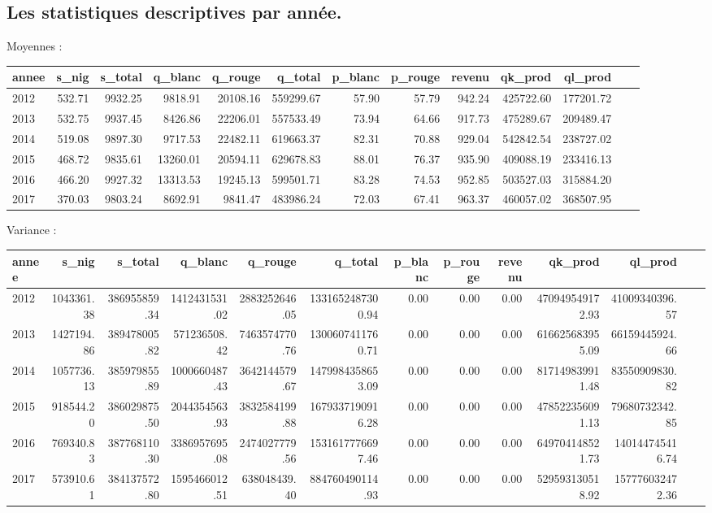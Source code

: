 \documentclass[11pt, a4paper]{article}
\begin{document}
\newpage
\begin{landscape}
\section*{Les statistiques descriptives par année.}
\par
Moyennes :
\FloatBarrier
\hskip-2.0cm
\begin{center}
\begin{tabular}{lrrrrrrrrrrrr}
  \hline
  annee & s\_nig & s\_total & q\_blanc & q\_rouge & q\_total & p\_blanc & p\_rouge & revenu & qk\_prod & ql\_prod \\ 
  \hline
  2012 & 532.71 & 9932.25 & 9818.91 & 20108.16 & 559299.67 & 57.90 & 57.79 & 942.24 & 425722.60 & 177201.72 \\ 
  2013 & 532.75 & 9937.45 & 8426.86 & 22206.01 & 557533.49 & 73.94 & 64.66 & 917.73 & 475289.67 & 209489.47 \\ 
  2014 & 519.08 & 9897.30 & 9717.53 & 22482.11 & 619663.37 & 82.31 & 70.88 & 929.04 & 542842.54 & 238727.02 \\ 
  2015 & 468.72 & 9835.61 & 13260.01 & 20594.11 & 629678.83 & 88.01 & 76.37 & 935.90 & 409088.19 & 233416.13 \\ 
  2016 & 466.20 & 9927.32 & 13313.53 & 19245.13 & 599501.71 & 83.28 & 74.53 & 952.85 & 503527.03 & 315884.20 \\ 
  2017 & 370.03 & 9803.24 & 8692.91 & 9841.47 & 483986.24 & 72.03 & 67.41 & 963.37 & 460057.02 & 368507.95 \\ 
   \hline
\end{tabular} 
\end{center}
\FloatBarrier
Variance :
\FloatBarrier
\hskip-1.0cm\begin{tabular}{lrrrrrrrrrrrr}
    \hline
   annee & s\_nig & s\_total & q\_blanc & q\_rouge & q\_total & p\_blanc & p\_rouge & revenu & qk\_prod & ql\_prod \\
    \hline
    2012 & 1043361.38 & 386955859.34 & 1412431531.02 & 2883252646.05 & 1331652487300.94 & 0.00 & 0.00 & 0.00 & 470949549172.93 & 41009340396.57 \\
    2013 & 1427194.86 & 389478005.82 & 571236508.42 & 7463574770.76 & 1300607411760.71 & 0.00 & 0.00 & 0.00 & 616625683955.09 & 66159445924.66 \\
    2014 & 1057736.13 & 385979855.89 & 1000660487.43 & 3642144579.67 & 1479984358653.09 & 0.00 & 0.00 & 0.00 & 817149839911.48 & 83550909830.82 \\
    2015 & 918544.20 & 386029875.50 & 2044354563.93 & 3832584199.88 & 1679337190916.28 & 0.00 & 0.00 & 0.00 & 478522356091.13 & 79680732342.85 \\
    2016 & 769340.83 & 387768110.30 & 3386957695.08 & 2474027779.56 & 1531617776697.46 & 0.00 & 0.00 & 0.00 & 649704148521.73 & 140144745416.74 \\
    2017 & 573910.61 & 384137572.80 & 1595466012.51 & 638048439.40 & 884760490114.93 & 0.00 & 0.00 & 0.00 & 529593130518.92 & 157776032472.36 \\
     \hline
  \end{tabular}
\FloatBarrier
\end{landscape}
\newpage
\end{document}

